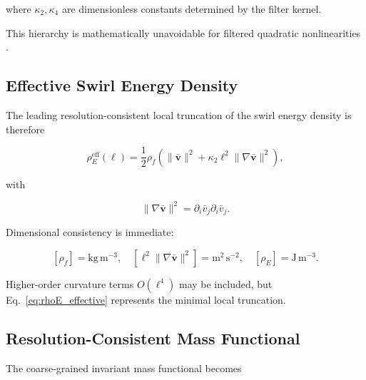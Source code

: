\documentclass[11pt]{article}
\theoremstyle{definition}
\theoremstyle{plain}
\theoremstyle{remark}
\begin{document}
        where $\kappa_2,\kappa_4$ are dimensionless constants
        determined by the filter kernel.

        This hierarchy is mathematically unavoidable
        for filtered quadratic nonlinearities
        \cite{Eyink2006}.


    \subsection{Effective Swirl Energy Density}

        The leading resolution-consistent local truncation of the swirl energy density is therefore

        \begin{equation}
            \rho_{\!E}^{\mathrm{eff}}(\ell)
            =
            \frac12 \rho_{\!f}
            \left(
                \lVert \bar{\mathbf{v}} \rVert^2
            +
                \kappa_2 \ell^2
                \lVert \nabla \bar{\mathbf{v}} \rVert^2
            \right),
            \label{eq:rhoE_effective}
        \end{equation}

        with

        \begin{equation}
            \lVert \nabla \bar{\mathbf{v}} \rVert^2
            =
            \partial_i \bar v_j \partial_i \bar v_j.
        \end{equation}

        Dimensional consistency is immediate:

        \[
            [\rho_{\!f}] = \mathrm{kg\,m^{-3}},
            \quad
            [\ell^2 \lVert \nabla \bar{\mathbf{v}}\rVert^2] = \mathrm{m^2\,s^{-2}},
            \quad
            [\rho_{\!E}] = \mathrm{J\,m^{-3}}.
        \]

        Higher-order curvature terms $O(\ell^4)$ may be included,
        but Eq.~\eqref{eq:rhoE_effective} represents the minimal local truncation.


    \subsection{Resolution-Consistent Mass Functional}

        The coarse-grained invariant mass functional becomes
\end{document}
